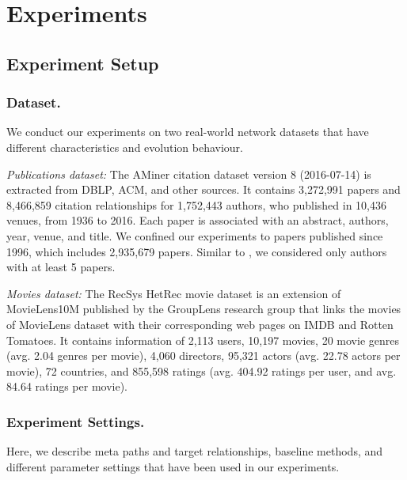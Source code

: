 \section{Experiments}



\subsection{Experiment Setup}

\subsubsection{Dataset.} We conduct our experiments on two real-world network datasets that have different characteristics and evolution behaviour. 

\textit{Publications dataset:} The AMiner citation dataset \cite{Tang:08KDD} version 8 (2016-07-14) is extracted from DBLP, ACM, and other sources. It contains 3,272,991 papers and 8,466,859 citation relationships for 1,752,443 authors, who published in 10,436 venues, from 1936 to 2016. Each paper is associated with an abstract, authors, year, venue, and title. We confined our experiments to papers published since 1996, which includes 2,935,679 papers. Similar to \cite{sun2011ASONAM}, we considered only authors with at least 5 papers.
    
\textit{Movies dataset:} The RecSys HetRec movie dataset \cite{Cantador:RecSys2011} is an extension of MovieLens10M published by the GroupLens research group that links the movies of MovieLens dataset with their corresponding web pages on IMDB and Rotten Tomatoes. It contains information of 2,113 users, 10,197 movies, 20 movie genres (avg. 2.04 genres per movie), 4,060 directors, 95,321 actors (avg. 22.78 actors per movie), 72 countries, and 855,598 ratings (avg. 404.92 ratings per user, and avg. 84.64 ratings per movie).%


\subsubsection{Experiment Settings.} Here, we describe meta paths and target relationships, baseline methods, and different parameter settings that have been used in our experiments.


